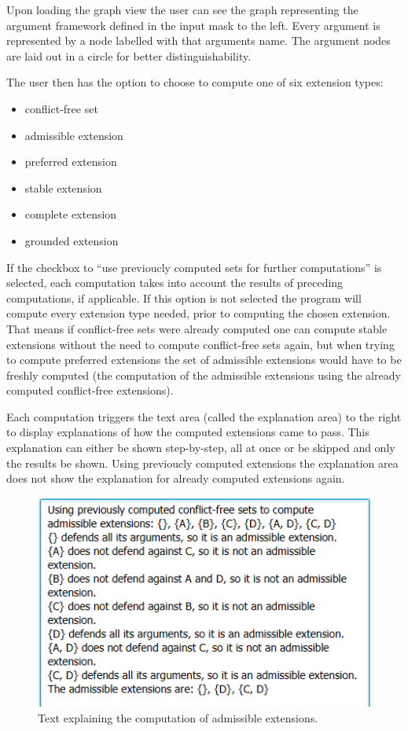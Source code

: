 \documentclass[draft,final]{vutinfth} %
\newcommand{\hl}{\par\vspace{6pt}} %
\begin{document}
Upon loading the graph view the user can see the graph representing the argument framework defined in the input mask to the left. Every argument is represented by a node labelled with that arguments name. The argument nodes are laid out in a circle for better distinguishability.\hl
The user then has the option to choose to compute one of six extension types:

\begin{itemize}[noitemsep]
	\item conflict-free set
	\item admissible extension
	\item preferred extension
	\item stable extension
	\item complete extension
	\item grounded extension
\end{itemize}

If the checkbox to ``use previoucly computed sets for further computations'' is selected, each computation takes into account the results of preceding computations, if applicable. If this option is not selected the program will compute every extension type needed, prior to computing the chosen extension.\\
That means if conflict-free sets were already computed one can compute stable extensions without the need to compute conflict-free sets again, but when trying to compute preferred extensions the set of admissible extensions would have to be freshly computed (the computation of the admissible extensions using the already computed conflict-free extensions).\hl
Each computation triggers the text area (called the explanation area) to the right to display explanations of how the computed extensions came to pass. This explanation can either be shown step-by-step, all at once or be skipped and only the results be shown. Using previoucly computed extensions the explanation area does not show the explanation for already computed extensions again.

\FloatBarrier
	\begin{figure}[!htb]
		\centering
		\includegraphics{pics/explanation.png}
		\caption{Text explaining the computation of admissible extensions.}
	\end{figure}
\FloatBarrier
\end{document}
